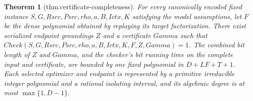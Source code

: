 \documentclass{article}
\newtheorem{theorem}{Theorem}
\begin{document}
\begin{theorem}[thm:certificate-completeness]\label{thm:certificate-completeness}
For every canonically encoded fixed instance \(S,G,Rsrc,Psrc,rho,a,B,Ictx,K\) satisfying the model assumptions, let \(F\) be the dense polynomial obtained by replaying its target factorization. There exist serialized endpoint groundings \(Z\) and a certificate \(Gamma\) such that \(Check(S,G,Rsrc,Psrc,rho,a,B,Ictx,K,F,Z,Gamma)=1\). The combined bit length of \(Z\) and \(Gamma\), and the checker's bit running time on the complete input and certificate, are bounded by one fixed polynomial in \(D+LF+T+1\). Each selected optimizer and endpoint is represented by a primitive irreducible integer polynomial and a rational isolating interval, and its algebraic degree is at most \(\max\{1,D-1\}\).
\end{theorem}
\end{document}

